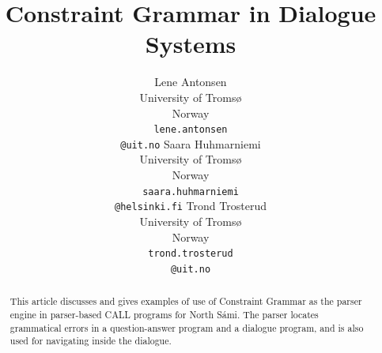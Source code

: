 \documentclass[11pt]{article}
\begin{document}
\title{Constraint Grammar in Dialogue Systems}

\author{Lene Antonsen\\
  University of Tromsø\\
  Norway\\
  {\tt lene.antonsen}\\{\tt @uit.no}  \And
  Saara Huhmarniemi\\
  University of Tromsø\\
  Norway\\
  {\tt saara.huhmarniemi}\\{\tt @helsinki.fi}  \And
  Trond Trosterud\\
  University of Tromsø\\
  Norway\\
  {\tt trond.trosterud}\\{\tt @uit.no}}



\maketitle
{}


 
\maketitle

\begin{abstract}
This article discusses and gives examples of use of Constraint Grammar as the parser engine in parser-based CALL programs for North Sámi. The parser locates grammatical errors in a question-answer program and a dialogue program, and is also used for navigating inside the dialogue.

\end{abstract}
\end{document}
